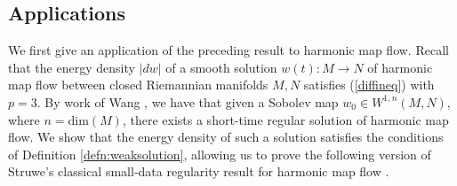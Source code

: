\documentclass[12pt]{amsart}
\renewcommand{\1}{{\mathbf 1}}
\newtheorem{cor}[thm]{Corollary}
\theoremstyle{others}
\numberwithin{equation}{section}
\begin{document}

\subsection{Applications} 
We first give an application of the preceding result to harmonic map flow. Recall that the energy density \(|dw|\) of a smooth solution \(w(t) : M \to N\) of harmonic map flow between closed Riemannian manifolds \(M, N\) satisfies (\ref{diffineq}) with \(p = 3\).  By work of Wang \cite{hmfLngradient, hmfbmo}, we have that given a Sobolev map \(w_0 \in W^{1, n}(M, N)\), where \(n = \text{dim}(M)\), there exists a %
short-time regular solution of harmonic map flow. %
We show that the energy density of such a solution satisfies the conditions of Definition \ref{defn:weaksolution}, %
allowing us to %
prove the following %
version of Struwe's classical small-data regularity result for harmonic map flow \cite[Theorem 7.1]{struwehigherdimhmf}. 
\end{document}
